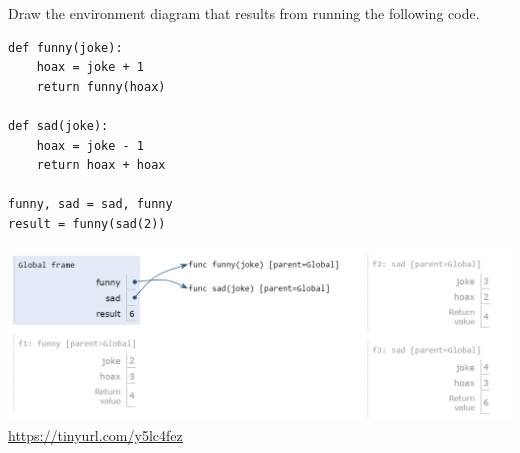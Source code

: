 \begin{blocksection}
\question Draw the environment diagram that results from running the following code.

\begin{lstlisting}
def funny(joke):
    hoax = joke + 1
    return funny(hoax)

def sad(joke):
    hoax = joke - 1
    return hoax + hoax

funny, sad = sad, funny
result = funny(sad(2))
\end{lstlisting}
\begin{solution}[2in]
\includegraphics[scale=0.5]{joke.png}
\\
\url{https://tinyurl.com/y5lc4fez}
\end{solution}
\end{blocksection}

